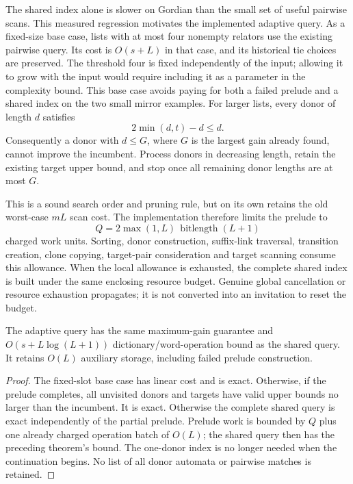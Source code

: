 The shared index alone is slower on Gordian than the small set of useful
pairwise scans.  This measured regression motivates the implemented
adaptive query.  As a fixed-size base case, lists with at most four
nonempty relators use the existing pairwise query.  Its cost is $O(s+L)$
in that case, and its historical tie choices are preserved.  The threshold
four is fixed independently of the input; allowing it to grow with the
input would require including it as a parameter in the complexity bound.
This base case avoids paying for both a failed prelude and a shared index
on the two small mirror examples.  For larger lists, every donor of
length $d$ satisfies
\[
 2\min(d,t)-d\le d.
\]
Consequently a donor with $d\le G$, where $G$ is the largest gain already
found, cannot improve the incumbent.  Process donors in decreasing length,
retain the existing target upper bound, and stop once all remaining donor
lengths are at most $G$.

This is a sound search order and pruning rule, but on its own retains the
old worst-case $mL$ scan cost.  The implementation therefore limits the
prelude to
\[
 Q=2\max(1,L)\,\operatorname{bitlength}(L+1)
\]
charged work units.  Sorting, donor construction, suffix-link traversal,
transition creation, clone copying, target-pair consideration and target
scanning consume this allowance.  When the local allowance is exhausted,
the complete shared index is built under the same enclosing resource
budget.  Genuine global cancellation or resource exhaustion propagates;
it is not converted into an invitation to reset the budget.

\begin{corollary}
The adaptive query has the same maximum-gain guarantee and
$O(s+L\log(L+1))$ dictionary/word-operation bound as the shared query.
It retains $O(L)$ auxiliary storage, including failed prelude construction.
\end{corollary}
\begin{proof}
The fixed-slot base case has linear cost and is exact.  Otherwise, if
the prelude completes, all unvisited donors and targets have valid upper
bounds no larger than the incumbent.  It is exact.  Otherwise the complete
shared query is exact independently of the partial prelude.  Prelude work
is bounded by $Q$ plus one already charged operation batch of $O(L)$; the
shared query then has the preceding theorem's bound.  The one-donor
index is no longer needed when the continuation begins.  No list of
all donor automata or pairwise matches is retained.
\end{proof}

